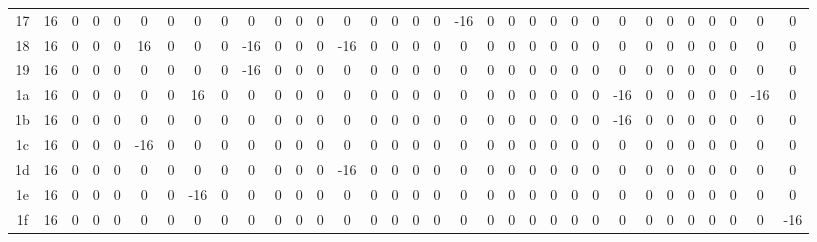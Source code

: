 \documentclass[11pt]{article}
\begin{document}
\begin{table}[htbp]
{\begin{tabular}{c|*{32}{c}}
    17 & 16 & 0 & 0 & 0 & 0 & 0 & 0 & 0 & 0 & 0 & 0 & 0 & 0 & 0 & 0 & 0 & 0 & -16 & 0 & 0 & 0 & 0 & 0 & 0 & 0 & 0 & 0 & 0 & 0 & 0 & 0 & 0\\
    18 & 16 & 0 & 0 & 0 & 16 & 0 & 0 & 0 & -16 & 0 & 0 & 0 & -16 & 0 & 0 & 0 & 0 & 0 & 0 & 0 & 0 & 0 & 0 & 0 & 0 & 0 & 0 & 0 & 0 & 0 & 0 & 0\\
    19 & 16 & 0 & 0 & 0 & 0 & 0 & 0 & 0 & -16 & 0 & 0 & 0 & 0 & 0 & 0 & 0 & 0 & 0 & 0 & 0 & 0 & 0 & 0 & 0 & 0 & 0 & 0 & 0 & 0 & 0 & 0 & 0\\
    1a & 16 & 0 & 0 & 0 & 0 & 0 & 16 & 0 & 0 & 0 & 0 & 0 & 0 & 0 & 0 & 0 & 0 & 0 & 0 & 0 & 0 & 0 & 0 & 0 & -16 & 0 & 0 & 0 & 0 & 0 & -16 & 0\\
    1b & 16 & 0 & 0 & 0 & 0 & 0 & 0 & 0 & 0 & 0 & 0 & 0 & 0 & 0 & 0 & 0 & 0 & 0 & 0 & 0 & 0 & 0 & 0 & 0 & -16 & 0 & 0 & 0 & 0 & 0 & 0 & 0\\
    1c & 16 & 0 & 0 & 0 & -16 & 0 & 0 & 0 & 0 & 0 & 0 & 0 & 0 & 0 & 0 & 0 & 0 & 0 & 0 & 0 & 0 & 0 & 0 & 0 & 0 & 0 & 0 & 0 & 0 & 0 & 0 & 0\\
    1d & 16 & 0 & 0 & 0 & 0 & 0 & 0 & 0 & 0 & 0 & 0 & 0 & -16 & 0 & 0 & 0 & 0 & 0 & 0 & 0 & 0 & 0 & 0 & 0 & 0 & 0 & 0 & 0 & 0 & 0 & 0 & 0\\
    1e & 16 & 0 & 0 & 0 & 0 & 0 & -16 & 0 & 0 & 0 & 0 & 0 & 0 & 0 & 0 & 0 & 0 & 0 & 0 & 0 & 0 & 0 & 0 & 0 & 0 & 0 & 0 & 0 & 0 & 0 & 0 & 0\\
    1f & 16 & 0 & 0 & 0 & 0 & 0 & 0 & 0 & 0 & 0 & 0 & 0 & 0 & 0 & 0 & 0 & 0 & 0 & 0 & 0 & 0 & 0 & 0 & 0 & 0 & 0 & 0 & 0 & 0 & 0 & 0 & -16\\
    \bottomrule
    \end{tabular}
}
\end{table}
\end{document}
